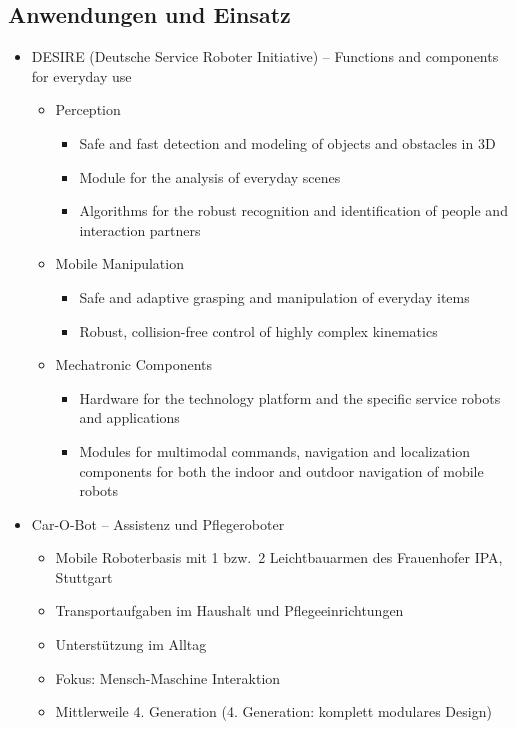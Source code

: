 \subsection{Anwendungen und Einsatz}
\begin{itemize}
	\item DESIRE (Deutsche Service Roboter Initiative) -- Functions and components for everyday use
	\begin{itemize}
		\item Perception
		\begin{itemize}
			\item Safe and fast detection and modeling of objects and obstacles in 3D
			\item Module for the analysis of everyday scenes
			\item Algorithms for the robust recognition and identification of people and interaction partners
		\end{itemize}
		\item Mobile Manipulation
		\begin{itemize}
			\item Safe and adaptive grasping and manipulation of everyday items
			\item Robust, collision-free control of highly complex kinematics
		\end{itemize}
		\item Mechatronic Components
		\begin{itemize}
			\item Hardware for the technology platform and the specific service robots and applications
			\item Modules for multimodal commands, navigation and localization components for both the indoor and outdoor navigation of mobile robots
		\end{itemize}
	\end{itemize}
	\item Car-O-Bot -- Assistenz und Pflegeroboter
	\begin{itemize}
		\item Mobile Roboterbasis mit 1 bzw.\ 2 Leichtbauarmen des Frauenhofer IPA, Stuttgart
		\item Transportaufgaben im Haushalt und Pflegeeinrichtungen
		\item Unterstützung im Alltag
		\item Fokus: Mensch-Maschine Interaktion
		\item Mittlerweile 4. Generation (4. Generation: komplett modulares Design)
	\end{itemize}

\end{itemize}
